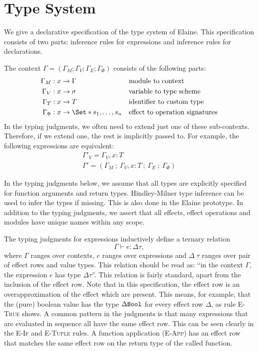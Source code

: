 \section{Type System}

We give a declarative specification of the type system of Elaine. This specification consists of two parts: inference rules for expressions and inference rules for declarations.

The context $\Gamma = (\Gamma_M; \Gamma_V; \Gamma_E; \Gamma_\Phi)$ consists of the following parts:
\begin{align*}
    \Gamma_M &: x \to \Gamma&& \text{module to context}\\
    \Gamma_V &: x \to \sigma && \text{variable to type scheme}\\
    \Gamma_T &: x \to T && \text{identifier to custom type}\\
    \Gamma_\Phi &: x \to \S{s_1,\dots,s_n} && \text{effect to operation signatures}
\end{align*}
In the typing judgments, we often need to extend just one of these sub-contexts. Therefore, if we extend one, the rest is implicitly passed to. For example, the following expressions are equivalent:
\begin{gather*}
    \Gamma'_V = \Gamma_V, x: T \\
    \Gamma' = (\Gamma_M\ ;\ \Gamma_V, x: T\ ;\ \Gamma_E\ ;\ \Gamma_\Phi)
\end{gather*}

In the typing judgments below, we assume that all types are explicitly specified for function arguments and return types. Hindley-Milner type inference can be used to infer the types if missing. This is also done in the Elaine prototype. In addition to the typing judgments, we assert that all effects, effect operations and modules have unique names within any scope.

The typing judgments for expressions inductively define a ternary relation
\[ \Gamma \vdash e : \Delta\tau, \]
where $\Gamma$ ranges over contexts, $e$ ranges over expressions and $\Delta\;\tau$ ranges over pair of effect rows and value types. This relation should be read as: ``in the context $\Gamma$, the expression $e$ has type $\Delta\tau$''. This relation is fairly standard, apart from the inclusion of the effect row. Note that in this specification, the effect row is an overapproximation of the effect which are present. This means, for example, that the (pure) boolean value  has the type $\Delta\text{\texttt{Bool}}$ for every effect row $\Delta$, as rule \textsc{E-True} shows. A common pattern in the judgments is that many expressions that are evaluated in sequence all have the same effect row. This can be seen clearly in the \textsc{E-If} and \textsc{E-Tuple} rules. A function application (\textsc{E-App}) has an effect row that matches the same effect row on the return type of the called function. 

